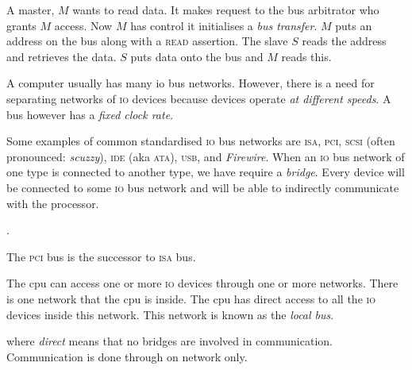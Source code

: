 \begin{example}
A master, $M$ wants to read data. It makes request to the bus arbitrator who grants $M$ access. 
Now $M$ has control it initialises a \textit{bus transfer}. $M$ puts an address on the bus 
along with a \textsc{read} assertion. The slave $S$ reads the address and retrieves the data. 
$S$ puts data onto the bus and $M$ reads this. 
\end{example}

\frmrule






A computer usually has many io bus networks. However, there is a need for separating networks 
of \textsc{io} devices because devices operate \textit{at different speeds}. 
A bus however has a \textit{fixed clock rate}. 

Some examples of common standardised \textsc{io} bus networks are \textsc{isa}, \textsc{pci}, 
\textsc{scsi} (often pronounced: \textit{scuzzy}), \textsc{ide} (aka \textsc{ata}), \textsc{usb}, and \textit{Firewire}. 
When an \textsc{io} bus network of one type is connected to another type, we have require a \textit{bridge}. 
Every device will be connected to some \textsc{io} bus network and will be able to indirectly 
communicate with the processor.


. 



The \textsc{pci} bus is the successor to \textsc{isa} bus.




The cpu can access one or more \textsc{io} devices through one or more networks.
There is one network that the cpu is inside. The cpu has direct access to all the \textsc{io} devices 
inside this network. This network is known as the \textit{local bus}. 


where \textit{direct} means that no bridges are involved in communication. 
Communication is done through on network only.

